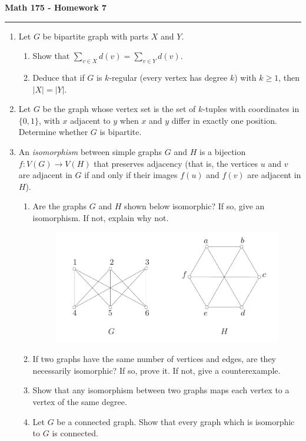 \documentclass[11pt,letterpaper]{report}
\begin{document}
\begin{center}
{\bf \Large Math 175 - Homework 7}
\vspace{0.2cm}
\hrule
\end{center}

\begin{enumerate}
	\item Let $G$ be bipartite graph with parts $X$ and $Y$.
	\begin{enumerate}
		\item Show that $\sum_{v\in X}d(v) = \sum_{v\in Y}d(v)$.
		\item Deduce that if $G$ is $k$-regular (every vertex has degree $k$) with $k\geq 1$, then $|X| = |Y|$.
	\end{enumerate}

	\vfill

	\item Let $G$ be the graph whose vertex set is the set of $k$-tuples with coordinates in $\{0, 1\}$, with $x$ adjacent to $y$ when $x$ and $y$ differ in exactly one position. Determine whether $G$ is bipartite.
	\vfill

	\item An \textit{isomorphism} between simple graphs $G$ and $H$ is a bijection $f: V(G)\to V(H)$ that preserves adjacency (that is, the vertices $u$ and $v$ are adjacent in $G$ if and only if their images $f(u)$ and $f(v)$ are adjacent in $H$).
	\begin{enumerate}
		\item Are the graphs $G$ and $H$ shown below isomorphic? If so, give an isomorphism. If not, explain why not.
		\begin{figure}[h]
			\center\includegraphics[scale=0.5]{iso.png}
		\end{figure}
		\item If two graphs have the same number of vertices and edges, are they necessarily isomorphic? If so, prove it. If not, give a counterexample.
		\item Show that any isomorphism between two graphs maps each vertex to a vertex of the same degree.
		\item Let $G$ be a connected graph. Show that every graph which is isomorphic to $G$ is connected.
	\end{enumerate}
	\vfill\pagebreak



\end{enumerate}
\end{document}
